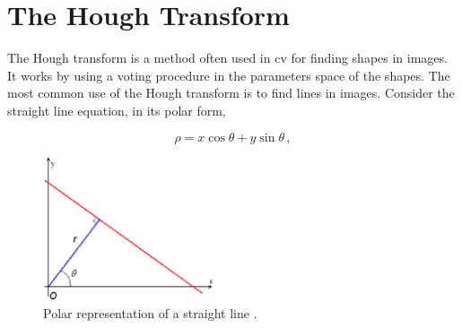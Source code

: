 \section{The Hough Transform}\label{sec:hough}
The Hough transform is a method often used in \acrshort{cv} for finding shapes in images. It works by using a voting procedure in the parameters space of the shapes. The most common use of the Hough transform is to find lines in images.
Consider the straight line equation, in its polar form,

\begin{equation*}
  \rho = x \cos{\theta} + y \sin{\theta} \,,
\end{equation*}

\begin{figure}[htbp]
  \centering
  \includegraphics[width=0.45\textwidth]{gfx/R_theta_line.eps}
  \caption{Polar representation of a straight line \cite{pichough}.}
  \label{fig:linePolar}
\end{figure}

